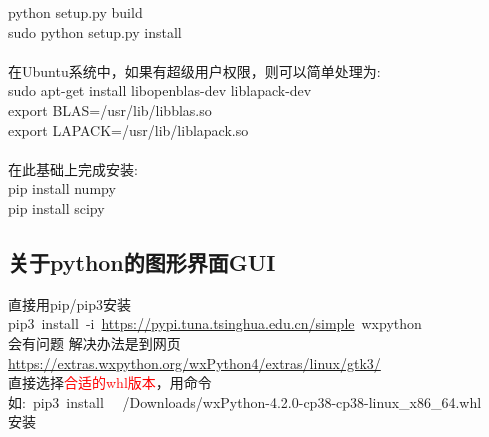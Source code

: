 \documentclass[10pt,a4paper]{article}
\begin{document}
python setup.py build\\
sudo python setup.py install\\
\\
在\textrm{Ubuntu}系统中，如果有超级用户权限，则可以简单处理为:\\
sudo apt-get install libopenblas-dev liblapack-dev\\
export BLAS=/usr/lib/libblas.so\\
export LAPACK=/usr/lib/liblapack.so\\
\\
在此基础上完成安装:\\
pip install numpy\\
pip install scipy\\

\subsection{关于\rm{python}的图形界面\rm{GUI}}
直接用\textrm{pip/pip3}安装\\
\textrm{pip3~install~-i~\url{https://pypi.tuna.tsinghua.edu.cn/simple}~wxpython}\\
会有问题
解决办法是到网页\\
\url{https://extras.wxpython.org/wxPython4/extras/linux/gtk3/}\\
直接选择\textcolor{red}{合适的\textrm{whl}版本}，用命令\\
如:~\textrm{pip3~install~ ~/Downloads/wxPython-4.2.0-cp38-cp38-linux_x86_64.whl}\\
安装
\end{document}
